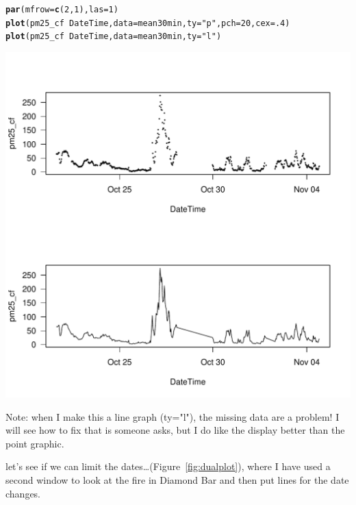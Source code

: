 \documentclass{article}\usepackage[]{graphicx}\usepackage[]{color}
\makeatletter
\def\maxwidth{ %
  \ifdim\Gin@nat@width>\linewidth
    \linewidth
  \else
    \Gin@nat@width
  \fi
}
\newcommand{\hlnum}[1]{\textcolor[rgb]{0.686,0.059,0.569}{#1}}%
\newcommand{\hlstr}[1]{\textcolor[rgb]{0.192,0.494,0.8}{#1}}%
\newcommand{\hlopt}[1]{\textcolor[rgb]{0,0,0}{#1}}%
\newcommand{\hlstd}[1]{\textcolor[rgb]{0.345,0.345,0.345}{#1}}%
\newcommand{\hlkwc}[1]{\textcolor[rgb]{0.333,0.667,0.333}{#1}}%
\newcommand{\hlkwd}[1]{\textcolor[rgb]{0.737,0.353,0.396}{\textbf{#1}}}%
\newenvironment{kframe}{%
 \def\at@end@of@kframe{}%
 \ifinner\ifhmode%
  \def\at@end@of@kframe{\end{minipage}}%
  \begin{minipage}{\columnwidth}%
 \fi\fi%
 \def\FrameCommand##1{\hskip\@totalleftmargin \hskip-\fboxsep
 \colorbox{shadecolor}{##1}\hskip-\fboxsep
     \hskip-\linewidth \hskip-\@totalleftmargin \hskip\columnwidth}%
 \MakeFramed {\advance\hsize-\width
   \@totalleftmargin\z@ \linewidth\hsize
   \@setminipage}}%
 {\par\unskip\endMakeFramed%
 \at@end@of@kframe}
\newenvironment{knitrout}{}{} %
\def\maxwidth{ %
  \ifdim\Gin@nat@width>\linewidth
    \linewidth
  \else
    \Gin@nat@width
  \fi
}
\makeatother
\begin{document}
\begin{knitrout}
\color{fgcolor}\begin{kframe}
\begin{alltt}
\hlkwd{par}\hlstd{(}\hlkwc{mfrow}\hlstd{=}\hlkwd{c}\hlstd{(}\hlnum{2}\hlstd{,}\hlnum{1}\hlstd{),} \hlkwc{las}\hlstd{=}\hlnum{1}\hlstd{)}
\hlkwd{plot}\hlstd{(pm25_cf} \hlopt{~} \hlstd{DateTime,} \hlkwc{data}\hlstd{=mean30min,} \hlkwc{ty}\hlstd{=}\hlstr{"p"}\hlstd{,} \hlkwc{pch}\hlstd{=}\hlnum{20}\hlstd{,} \hlkwc{cex}\hlstd{=}\hlnum{.4}\hlstd{)}
\hlkwd{plot}\hlstd{(pm25_cf} \hlopt{~} \hlstd{DateTime,} \hlkwc{data}\hlstd{=mean30min,} \hlkwc{ty}\hlstd{=}\hlstr{"l"}\hlstd{)}
\end{alltt}
\end{kframe}
\includegraphics[width=\maxwidth]{figure/unnamed-chunk-20-1} 

\end{knitrout}

Note: when I make this a line graph (ty="l"), the missing data are a problem!  I will see how to fix that is someone asks, but I do like the display better than the point graphic.

let's see if we can limit the dates\ldots (Figure~\ref{fig:dualplot}), where I have used a second window to look at the fire in Diamond Bar and then put lines for the date changes. 
\end{document}
